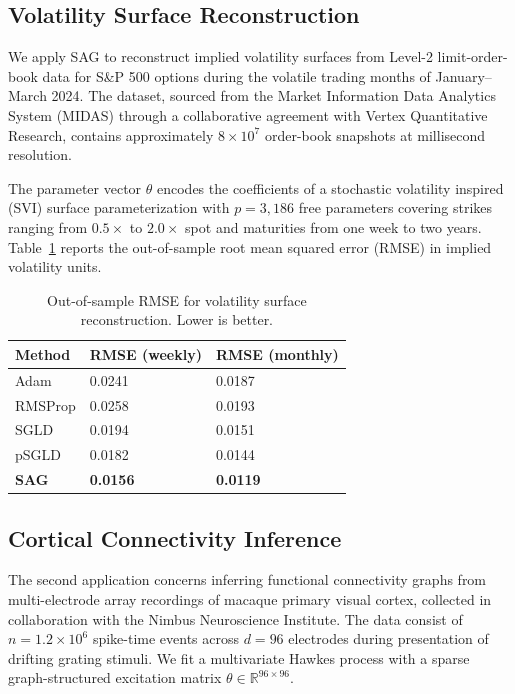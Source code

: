 \documentclass[12pt,letterpaper,twoside]{report}
\begin{document}
\subsection{Volatility Surface Reconstruction}

We apply SAG to reconstruct implied volatility surfaces from Level-2 limit-order-book data for S\&P 500 options during the volatile trading months of January--March 2024. The dataset, sourced from the Market Information Data Analytics System (MIDAS) through a collaborative agreement with Vertex Quantitative Research, contains approximately $8\times 10^{7}$ order-book snapshots at millisecond resolution.

The parameter vector $\theta$ encodes the coefficients of a stochastic volatility inspired (SVI) surface parameterization with $p = 3{,}186$ free parameters covering strikes ranging from $0.5\times$ to $2.0\times$ spot and maturities from one week to two years. Table~\ref{tab:vol} reports the out-of-sample root mean squared error (RMSE) in implied volatility units.

\begin{table}[htbp]
\centering
\caption{Out-of-sample RMSE for volatility surface reconstruction. Lower is better.}
\label{tab:vol}
\begin{tabularx}{0.80\textwidth}{lXX}
\toprule
\textbf{Method} & \textbf{RMSE (weekly)} & \textbf{RMSE (monthly)} \\
\midrule
Adam & 0.0241 & 0.0187 \\
RMSProp & 0.0258 & 0.0193 \\
SGLD & 0.0194 & 0.0151 \\
pSGLD & 0.0182 & 0.0144 \\
\textbf{SAG} & \textbf{0.0156} & \textbf{0.0119} \\
\bottomrule
\end{tabularx}
\end{table}

\subsection{Cortical Connectivity Inference}

The second application concerns inferring functional connectivity graphs from multi-electrode array recordings of macaque primary visual cortex, collected in collaboration with the Nimbus Neuroscience Institute. The data consist of $n = 1.2 \times 10^{6}$ spike-time events across $d = 96$ electrodes during presentation of drifting grating stimuli. We fit a multivariate Hawkes process with a sparse graph-structured excitation matrix $\theta \in \mathbb{R}^{96 \times 96}$.
\end{document}
